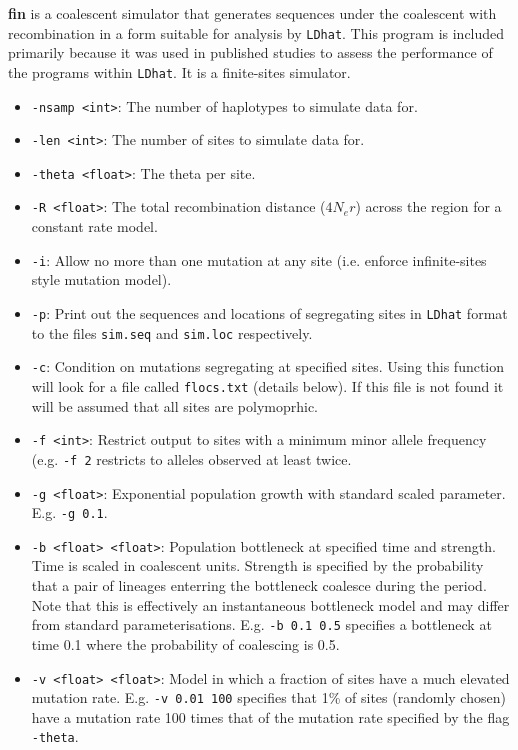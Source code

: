 \documentclass[a4paper,10pt,fullpage]{article}
\begin{document}
{\bf fin} is a coalescent simulator that generates sequences under the coalescent with recombination in a form suitable for analysis by \verb+LDhat+.  This program is included primarily because it was used in published studies to assess the performance of the programs within \verb+LDhat+.  It is a finite-sites simulator.
\begin{itemize}
\item \verb+-nsamp <int>+: The number of haplotypes to simulate data for.
\item \verb+-len <int>+: The number of sites to simulate data for.
\item \verb+-theta <float>+: The theta per site.
\item \verb+-R <float>+: The total recombination distance ($4N_er$) across the region for a constant rate model.
\item \verb+-i+: Allow no more than one mutation at any site (i.e. enforce infinite-sites style mutation model).
\item \verb+-p+: Print out the sequences and locations of segregating sites in \verb+LDhat+ format to the files \verb+sim.seq+ and \verb+sim.loc+ respectively.
\item \verb+-c+: Condition on mutations segregating at specified sites.  Using this function will look for a file called \verb+flocs.txt+ (details below).  If this file is not found it will be assumed that all sites are polymoprhic.
\item \verb+-f <int>+: Restrict output to sites with a minimum minor allele frequency (e.g. \verb+-f 2+ restricts to alleles observed at least twice.
\item \verb+-g <float>+: Exponential population growth with standard scaled parameter.   E.g. \verb+-g 0.1+.
\item \verb+-b <float> <float>+: Population bottleneck at specified time and strength.  Time is scaled in coalescent units.  Strength is specified by the probability that a pair of lineages enterring the bottleneck coalesce during the period.  Note that this is effectively an instantaneous bottleneck model and may differ from standard parameterisations. E.g. \verb+-b 0.1 0.5+ specifies a bottleneck at time 0.1 where the probability of coalescing is 0.5.
\item \verb+-v <float> <float>+: Model in which a fraction of sites have a much elevated mutation rate.  E.g. \verb+-v 0.01 100+ specifies that 1\% of sites (randomly chosen) have a mutation rate 100 times that of the mutation rate specified by the flag \verb+-theta+.

\end{itemize}
\end{document}
